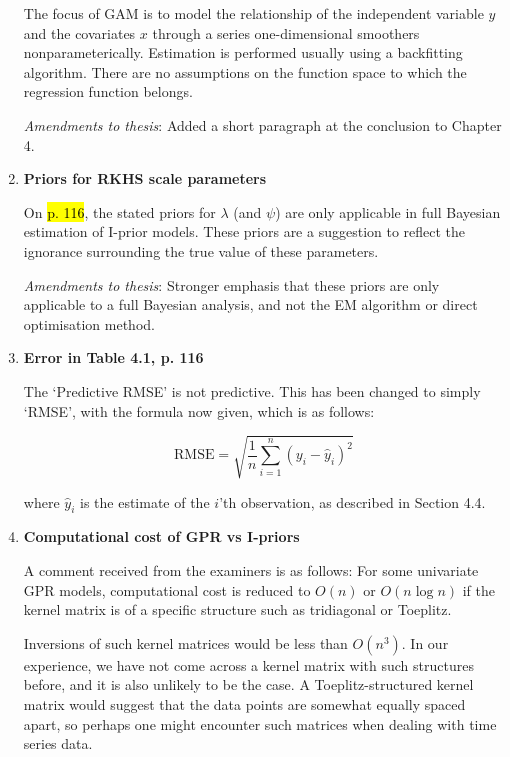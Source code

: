 \documentclass[11pt,showframe]{report}
\begin{document}
\begin{enumerate}
  The focus of GAM is to model the relationship of the independent variable $y$ and the covariates $x$ through a series one-dimensional smoothers nonparameterically.
  Estimation is performed usually using a backfitting algorithm.
  There are no assumptions on the function space to which the regression function belongs.

  \textit{Amendments to thesis}: Added a short paragraph at the conclusion to Chapter 4.

  \item \textbf{Priors for RKHS scale parameters}
  
  On \hl{p. 116}, the stated priors for $\lambda$ (and $\psi$) are only applicable in full Bayesian estimation of I-prior models.
  These priors are a suggestion to reflect the ignorance surrounding the true value of these parameters.
  
  \textit{Amendments to thesis}: Stronger emphasis that these priors are only applicable to a full Bayesian analysis, and not the EM algorithm or direct optimisation method.
  
  \item \textbf{Error in Table 4.1, p. 116}

  The `Predictive RMSE' is not predictive. This has been changed to simply `RMSE', with the formula now given, which is as follows:

  \begin{equation}
    \text{RMSE} = \sqrt{\frac{1}{n}\sum_{i=1}^n (y_i - \hat y_i)^2}
  \end{equation}
  
  where $\hat y_i$ is the estimate of the $i$'th observation, as described in Section 4.4.

  \item \textbf{Computational cost of GPR vs I-priors}

  A comment received from the examiners is as follows: For some univariate GPR models, computational cost is reduced to $O(n)$ or $O(n\log n)$ if the kernel matrix is of a specific structure such as tridiagonal or Toeplitz.
  
  Inversions of such kernel matrices would be less than $O(n^3)$.
  In our experience, we have not come across a kernel matrix with such structures before, and it is also unlikely to be the case.
  A Toeplitz-structured kernel matrix would suggest that the data points are somewhat equally spaced apart, so perhaps one might encounter such matrices when dealing with time series data.
  

\end{enumerate}
\end{document}
